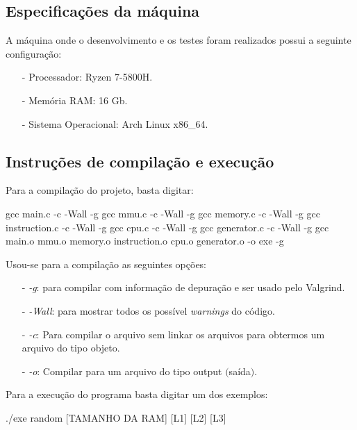 \documentclass{article}
\begin{document}
\subsection{Especificações da máquina}
A máquina onde o desenvolvimento e os testes foram realizados possui a seguinte configuração:

\begin{itemize}
    \item[-] Processador: Ryzen 7-5800H.
    \item[-] Memória RAM: 16 Gb.
    \item[-] Sistema Operacional: Arch Linux x86\_64.
\end{itemize}


\subsection{Instruções de compilação e execução}

Para a compilação do projeto, basta digitar:

\begin{tcolorbox}[title=Compilando o projeto,width=\linewidth]
    gcc main.c -c -Wall -g \newline
    gcc mmu.c -c -Wall -g \newline
    gcc memory.c -c -Wall -g \newline
    gcc instruction.c -c -Wall -g \newline
    gcc cpu.c -c -Wall -g \newline
    gcc generator.c -c -Wall -g \newline
    gcc main.o mmu.o memory.o instruction.o cpu.o generator.o -o exe -g
\end{tcolorbox}

Usou-se para a compilação as seguintes opções:

\begin{itemize}
    \item [-] \emph{-g}: para compilar com informação de depuração e ser usado pelo Valgrind.
    \item [-] \emph{-Wall}: para mostrar todos os possível \emph{warnings} do código.
    \item [-] \emph{-c}: Para compilar o arquivo sem linkar os arquivos para obtermos um arquivo do tipo objeto.
    \item [-] \emph{-o}: Compilar para um arquivo do tipo output $($saída$)$.
\end{itemize}

Para a execução do programa basta digitar um dos exemplos:
\begin{tcolorbox}[title=,width=\linewidth]
    ./exe random [TAMANHO DA RAM] [L1] [L2] [L3] \newline


\end{tcolorbox}
\end{document}
